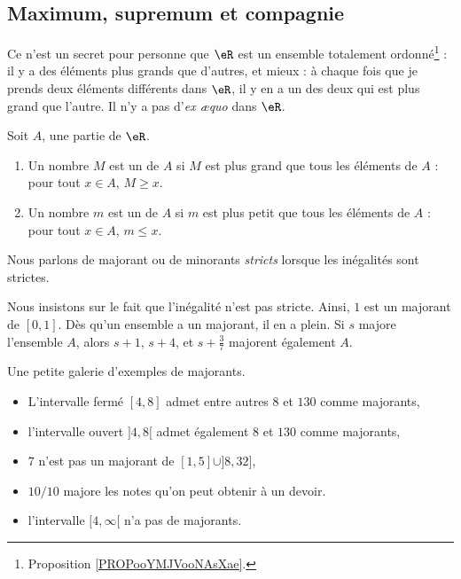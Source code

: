 \subsection{Maximum, supremum et compagnie}

Ce n'est un secret pour personne que $\eR$ est un ensemble totalement ordonné\footnote{Proposition \ref{PROPooYMJVooNAsXae}.} : il y a des éléments plus grands que d'autres, et mieux : à chaque fois que je prends deux éléments différents dans $\eR$, il y en a un des deux qui est plus grand que l'autre. Il n'y a pas d'\emph{ex æquo} dans $\eR$.

\begin{definition}
    Soit \( A\), une partie de \( \eR\). 
    \begin{enumerate}
        \item
            Un nombre \( M\) est un  de \( A\) si \( M\) est plus grand que tous les éléments de \( A\) : pour tout \( x\in A\), \( M\geq x\).
        \item
            Un nombre \( m\) est un  de \( A\) si \( m\) est plus petit que tous les éléments de \( A\) : pour tout \( x\in A\), \( m\leq x\).
    \end{enumerate}
    Nous parlons de majorant ou de minorants \emph{stricts} lorsque les inégalités sont strictes.
\end{definition}

Nous insistons sur le fait que l'inégalité n'est pas stricte. Ainsi, $1$ est un majorant de $[0,1]$. Dès qu'un ensemble a un majorant, il en a plein. Si $s$ majore l'ensemble $A$, alors $s+1$, $s+4$, et \( s+\frac{ 3 }{ 7 }\) majorent également $A$.

\begin{example}
Une petite galerie d'exemples de majorants.
\begin{itemize}
\item L'intervalle fermé $[4,8]$ admet entre autres $8$ et $130$ comme majorants,
\item l'intervalle ouvert $]4,8[$ admet également $8$ et $130$ comme majorants,
\item $7$ n'est pas un majorant de $[1,5]\cup]8,32]$,
\item $10/10$ majore les notes qu'on peut obtenir à un devoir.
\item l'intervalle $[4,\infty[$ n'a pas de majorants.
\end{itemize}
\end{example}

